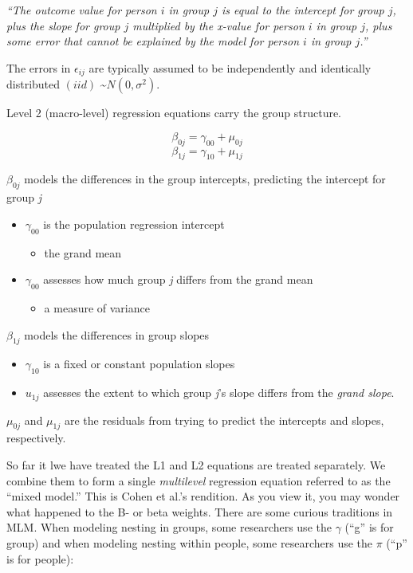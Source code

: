 \documentclass[
  english,
]{book}
\providecommand{\tightlist}{%
  \setlength{\itemsep}{0pt}\setlength{\parskip}{0pt}}
\begin{document}
\emph{``The outcome value for person \(i\) in group \(j\) is equal to the intercept for group \(j\), plus the slope for group \(j\) multiplied by the x-value for person \(i\) in group \(j\), plus some error that cannot be explained by the model for person \(i\) in group \(j\).''}

The errors in \(\epsilon_{ij}\) are typically assumed to be independently and identically distributed \((iid)\) \textasciitilde{}\(N(0, \sigma^2)\).

Level 2 (macro-level) regression equations carry the group structure.

\[\beta _{0j}=\gamma _{00}+\mu _{0j}\]
\[\beta _{1j}=\gamma _{10}+\mu_{1j}\]

\(\beta _{0j}\) models the differences in the group intercepts, predicting the intercept for group \emph{j}

\begin{itemize}
\tightlist
\item
  \(\gamma _{00}\) is the population regression intercept

  \begin{itemize}
  \tightlist
  \item
    the grand mean
  \end{itemize}
\item
  \(\gamma _{00}\) assesses how much group \emph{j} differs from the grand mean

  \begin{itemize}
  \tightlist
  \item
    a measure of variance
  \end{itemize}
\end{itemize}

\(\beta _{1j}\) models the differences in group slopes

\begin{itemize}
\tightlist
\item
  \(\gamma _{10}\) is a fixed or constant population slopes
\item
  \(u_{1j}\) assesses the extent to which group \emph{j}'s slope differs from the \emph{grand slope}.
\end{itemize}

\(\mu _{0j}\) and \(\mu_{1j}\) are the residuals from trying to predict the intercepts and slopes, respectively.

So far it lwe have treated the L1 and L2 equations are treated separately. We combine them to form a single \emph{multilevel} regression equation referred to as the ``mixed model.'' This is Cohen et al.'s \citeyearpar{cohen_applied_2003} rendition. As you view it, you may wonder what happened to the B- or beta weights. There are some curious traditions in MLM. When modeling nesting in groups, some researchers use the \(\gamma\) (``g'' is for group) and when modeling nesting within people, some researchers use the \(\pi\) (``p'' is for people):
\end{document}
